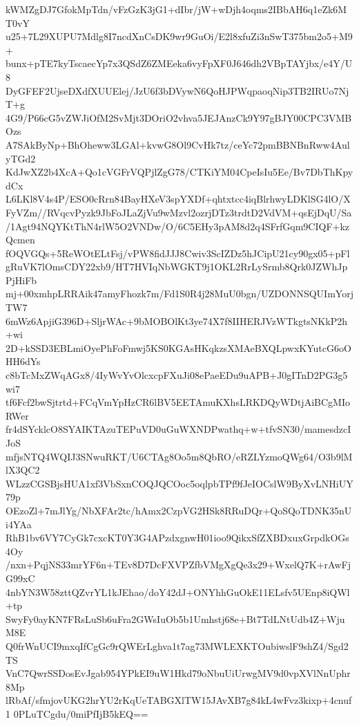 kWMZgDJ7GfokMpTdn/vFzGzK3jG1+dIbr/jW+wDjh4oqms2IBbAH6q1eZk6MT0vY
u25+7L29XUPU7Mdlg8I7ncdXnCsDK9wr9GuOi/E2l8xfuZi3nSwT375bm2o5+M9+
bunx+pTE7kyTscaecYp7x3QSdZ6ZMEeka6vyFpXF0J646dh2VBpTAYjbx/e4Y/U8
DyGFEF2UjseDXdfXUUElej/JzU6f3bDVywN6QoHJPWqpaoqNip3TB2IRUo7NjT+g
4G9/P66cG5vZWJiOfM2SvMjt3DOriO2vhva5JEJAnzCk9Y97gBJY00CPC3VMBOzs
A7SAkByNp+BhOheww3LGAl+kvwG8Ol9CvHk7tz/ceYc72pmBBNBnRww4AulyTGd2
KdJwXZ2b4XcA+Qo1cVGFrVQPjlZgG78/CTKiYM04CpeIsIu5Ee/Bv7DbThKpydCx
L6LKl8V4s4P/ESO0cRrn84BayHXeV3spYXDf+qhtxtcc4iqBlrhwyLDKlSG4lO/X
FyVZm//RVqcvPyzk9JbFoJLaZjVu9wMzvl2ozrjDTz3trdtD2VdVM+qsEjDqU/Sa
/1Agt94NQYKtThN4rlW5O2VNDw/O/6C5EHy3pAM8d2q4SFrfGqm9CIQF+kzQcmen
fOQVGQs+5ReWOtELtFsj/vPW8fidJJJ8Cwiv3ScIZDz5hJCipU21cy90gx05+pFl
gRuVK7lOmsCDY22xb9/HT7HVIqNbWGKT9j1OKL2RrLySrmb8Qrk0JZWhJpPjHiFb
mj+00xmhpLRRAik47amyFhozk7m/Fd1S0R4j28MuU0bgn/UZDONNSQUImYorjTW7
6mWz6ApjiG396D+SljrWAc+9bMOBOlKt3ye74X7f8IIHERJVzWTkgtsNKkP2h+wi
2D+kSSD3EBLmiOyePhFoFmwj5KS0KGAsHKqkzsXMAeBXQLpwxKYutcG6oOHH6dYs
c8bTcMxZWqAGx8/4IyWvYvOlcxcpFXuJi08ePaeEDu9uAPB+J0gITnD2PG3g5wi7
tf6Fcf2bwSjtrtd+FCqVmYpHzCR6lBV5EETAmuKXhsLRKDQyWDtjAiBCgMIoRWer
fr4dSYcklcO8SYAIKTAzuTEPuVD0uGuWXNDPwathq+w+tfvSN30/mamesdzcIJoS
mfjsNTQ4WQIJ3SNwuRKT/U6CTAg8Oo5m8QbRO/eRZLYzmoQWg64/O3b9lMlX3QC2
WLzzCGSBjsHUA1xf3VbSxnCOQJQCOoc5oqlpbTPf9fJeIOCslW9ByXvLNHiUY79p
OEzoZl+7mJlYg/NbXFAr2tc/hAmx2CzpVG2HSk8RRuDQr+QoSQoTDNK35nUi4YAa
RhB1bv6VY7CyGk7cxcKT0Y3G4APzdxgnwH01ioo9QikxSfZXBDxuxGrpdkOGs4Oy
/nxn+PqjNS33mrYF6n+TEv8D7DcFXVPZfbVMgXgQe3x29+WxelQ7K+rAwFjG99xC
4nbYN3W58zttQZvrYL1kJEhao/doY42dJ+ONYhhGuOkE11ELsfv5UEnp8iQWl+tp
SwyFy0ayKN7FRsLuSb6uFra2GWsIuOb5b1Umhstj68e+Bt7TdLNtUdb4Z+WjuM8E
Q0frWnUCI9mxqIfCgGc9rQWErLghva1t7ag73MWLEXKTOubiwslF9shZ4/Sgd2TS
VnC7QwrSSDosEvJgab954YPkEI9uW1Hkd79oNbuUiUrwgMV9d0vpXVlNnUphr8Mp
lRbAf/sfmjovUKG2hrYU2rKqUeTABGXlTW15JAvXB7g84kL4wFvz3kixp+4cnuf1
0PLuTCgdu/0miPfIjB5kEQ==
